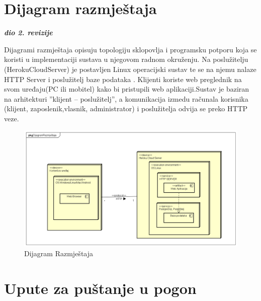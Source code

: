 \section{Dijagram razmještaja}
	
	\textbf{\textit{dio 2. revizije}}
	
	\text Dijagrami razmještaja opisuju topologiju sklopovlja i programsku potporu koja se koristi u implementaciji sustava u njegovom radnom okruženju. Na poslužitelju
	(HerokuCloudServer) je postavljen Linux operacijski sustav te se na njemu nalaze HTTP Server i poslužitelj baze podataka . Klijenti koriste web preglednik na svom uređaju(PC ili mobitel) kako bi pristupili web aplikaciji.Sustav je baziran na arhitekturi ”klijent – poslužitelj”, a komunikacija izmedu računala korisnika (klijent, zaposlenik,vlasnik, administrator) i poslužitelja odvija se preko HTTP veze.  

		\begin{figure}[H]
			\includegraphics[scale=0.5]{slike/Dijagram Razmjestaja.png} %
			\centering
			\caption { Dijagram Razmještaja}
			\label{fig:5.1}
			\end{figure}

\newpage


\section{Upute za puštanje u pogon}

